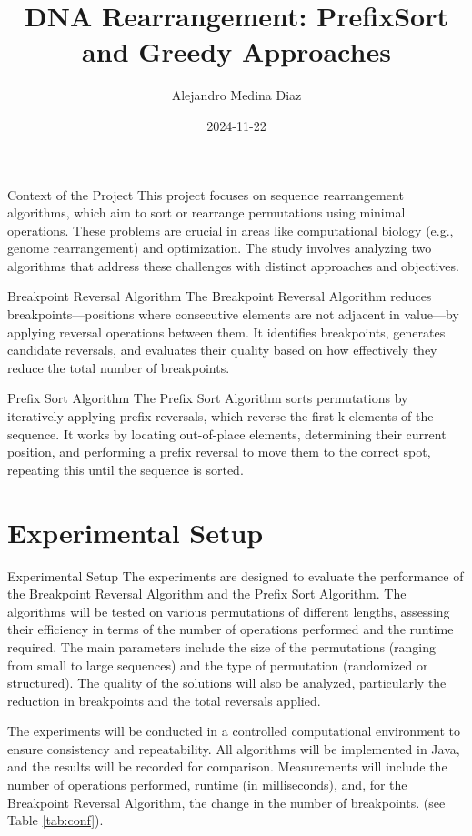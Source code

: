 \documentclass[
  11pt,
  a4paper,
]{article}
\title{DNA Rearrangement: PrefixSort and Greedy Approaches}
\author{Alejandro Medina Diaz}
\date{2024-11-22}
\begin{document}
\maketitle

Context of the Project
This project focuses on sequence rearrangement algorithms, which aim to sort or rearrange permutations using minimal operations. These problems are crucial in areas like computational biology (e.g., genome rearrangement) and optimization. The study involves analyzing two algorithms that address these challenges with distinct approaches and objectives.

Breakpoint Reversal Algorithm
The Breakpoint Reversal Algorithm reduces breakpoints---positions where consecutive elements are not adjacent in value---by applying reversal operations between them. It identifies breakpoints, generates candidate reversals, and evaluates their quality based on how effectively they reduce the total number of breakpoints.

Prefix Sort Algorithm
The Prefix Sort Algorithm sorts permutations by iteratively applying prefix reversals, which reverse the first k elements of the sequence. It works by locating out-of-place elements, determining their current position, and performing a prefix reversal to move them to the correct spot, repeating this until the sequence is sorted.

\section{Experimental Setup}\label{experimental-setup}

Experimental Setup
The experiments are designed to evaluate the performance of the Breakpoint Reversal Algorithm and the Prefix Sort Algorithm. The algorithms will be tested on various permutations of different lengths, assessing their efficiency in terms of the number of operations performed and the runtime required. The main parameters include the size of the permutations (ranging from small to large sequences) and the type of permutation (randomized or structured). The quality of the solutions will also be analyzed, particularly the reduction in breakpoints and the total reversals applied.

The experiments will be conducted in a controlled computational environment to ensure consistency and repeatability. All algorithms will be implemented in Java, and the results will be recorded for comparison. Measurements will include the number of operations performed, runtime (in milliseconds), and, for the Breakpoint Reversal Algorithm, the change in the number of breakpoints. (see Table \ref{tab:conf}).
\end{document}
